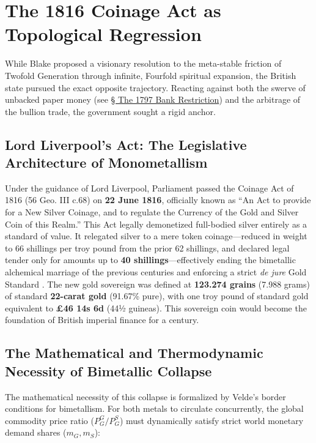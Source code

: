 \documentclass[
]{article}
\begin{document}
\newpage

\section{The 1816 Coinage Act as Topological
Regression}\label{sec-coinage-act-1816}

While Blake proposed a visionary resolution to the meta-stable friction
of Twofold Generation through infinite, Fourfold spiritual expansion,
the British state pursued the exact opposite trajectory. Reacting
against both the swerve of unbacked paper money (see
\hyperref[sec-bank-restriction-1797]{§ The 1797 Bank Restriction}) and
the arbitrage of the bullion trade, the government sought a rigid
anchor.

\subsection{Lord Liverpool's Act: The Legislative Architecture of
Monometallism}\label{lord-liverpools-act-the-legislative-architecture-of-monometallism}

Under the guidance of Lord Liverpool, Parliament passed the Coinage Act
of 1816 (56 Geo. III c.68) on \textbf{22 June 1816}, officially known as
``An Act to provide for a New Silver Coinage, and to regulate the
Currency of the Gold and Silver Coin of this Realm.'' This Act legally
demonetized full-bodied silver entirely as a standard of value. It
relegated silver to a mere token coinage---reduced in weight to 66
shillings per troy pound from the prior 62 shillings, and declared legal
tender only for amounts up to \textbf{40 shillings}---effectively ending
the bimetallic alchemical marriage of the previous centuries and
enforcing a strict \emph{de jure} Gold Standard
\citep{redish1990evolution}. The new gold sovereign was defined at
\textbf{123.274 grains} (7.988 grams) of standard \textbf{22-carat gold}
(91.67\% pure), with one troy pound of standard gold equivalent to
\textbf{£46 14s 6d} (44½ guineas). This sovereign coin would become the
foundation of British imperial finance for a century.

\subsection{The Mathematical and Thermodynamic Necessity of Bimetallic
Collapse}\label{the-mathematical-and-thermodynamic-necessity-of-bimetallic-collapse}

The mathematical necessity of this collapse is formalized by Velde's
border conditions for bimetallism. For both metals to circulate
concurrently, the global commodity price ratio (\(P_G^G / P_G^S\)) must
dynamically satisfy strict world monetary demand shares (\(m_G, m_S\)):
\end{document}
